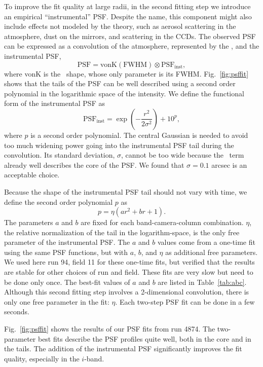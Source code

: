 To improve the fit quality at large radii, in the second fitting step we introduce an
empirical ``instrumental'' PSF. Despite the name, this component might also include 
effects not modeled by the \vk theory, such as aerosol scattering in the atmosphere,
dust on the mirrors, and scattering in the CCDs. The observed PSF can be expressed 
as a convolution of the atmosphere, represented 
by the \vk, and the instrumental PSF,
\begin{equation}
        \textrm{PSF} = \textrm{vonK} (\textrm{FWHM}) \otimes \textrm{PSF}_{\textrm{inst}},
\end{equation} 
where vonK is the \vk~shape, whose only parameter is its FWHM.
Fig.~\ref{fig:psffit} shows that the tails of the PSF can be well
described using a second order polynomial in the logarithmic space of
the intensity.
We define the functional form of the instrumental PSF as
\begin{equation}
        \textrm{PSF}_{\textrm{inst}} = \exp(-\frac{r^2}{2\sigma^2}) + 10^p,
\label{eq:psfinst}
\end{equation} 
where $p$ is a second order polynomial.
The central Gaussian is needed to avoid too much widening power going
into the instrumental PSF tail during the convolution.
Its standard deviation, $\sigma$, cannot be
too wide because the \vk~term already well describes the core of the
PSF.
We found that $\sigma = 0.1$ arcsec is an acceptable choice.

Because the shape of the instrumental PSF tail should not vary with
time, we define the second order polynomial $p$ as
\begin{equation}
        p = \eta(ar^2+br+1).
\label{eq:psfinstp}
\end{equation} 
The parameters $a$ and $b$ are
fixed for each band-camera-column combination.
$\eta$, the relative normalization of the 
tail in the logarithm-space, is the only free
parameter of the instrumental PSF.
The $a$ and $b$ values come from a one-time fit using the same PSF functions,
but with $a$, $b$, and $\eta$ as additional free parameters.
We used here run 94, field 11 for these one-time fits, but verified that 
the results are stable for other choices of run and field. 
These fits are very slow but need to be done only once.
The best-fit values of $a$ and $b$ are listed in Table~\ref{tab:abc}.
Although this second fitting step involves a 2-dimensional convolution,
there is only one free parameter in the fit: $\eta$. 
Each two-step PSF fit can be done in a few seconds.

Fig.~\ref{fig:psffit} shows the results of our PSF fits from run 4874. The two-parameter
best fits describe the PSF profiles quite well, both in the core and
in the tails. The addition of the instrumental PSF significantly improves the fit quality, 
especially in the $i$-band. 

